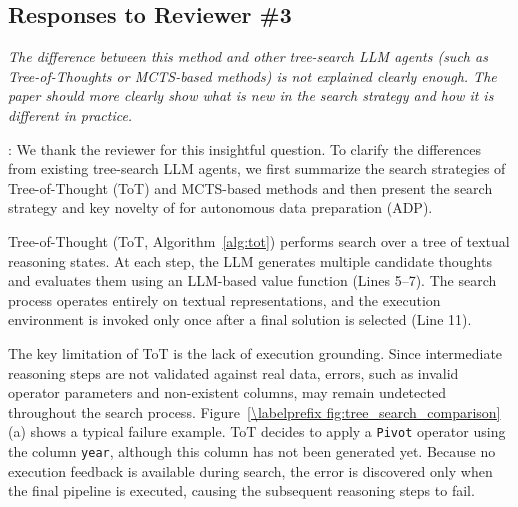 \subsection*{Responses to Reviewer \#3}
\label{cover_letter:r3}

\begin{shaded}
{
\emph{The difference between this method and other tree-search LLM agents (such as Tree-of-Thoughts or MCTS-based methods) is not explained clearly enough. The paper should more clearly show what is new in the search strategy and how it is different in practice.}
}
\end{shaded}

: 
We thank the reviewer for this insightful question. To clarify the differences from existing tree-search LLM agents, we first summarize the search strategies of Tree-of-Thought (ToT) and MCTS-based methods and then present the search strategy and key novelty of \sys for autonomous data preparation (ADP).


%
Tree-of-Thought (ToT, Algorithm~\ref{alg:tot}) performs search over a tree of textual reasoning states. At each step, the LLM generates multiple candidate thoughts and evaluates them using an LLM-based value function (Lines 5--7). The search process operates entirely on textual representations, and the execution environment is invoked only once after a final solution is selected (Line 11).

The key limitation of ToT is the lack of execution grounding. Since intermediate reasoning steps are not validated against real data, errors, such as invalid operator parameters and non-existent columns, may remain undetected throughout the search process.
%
Figure~\ref{\labelprefix fig:tree_search_comparison}(a) shows a typical failure example. ToT decides to apply a \texttt{Pivot} operator using the column \texttt{year}, although this column has not been generated yet. Because no execution feedback is available during search, the error is discovered only when the final pipeline is executed, causing the subsequent reasoning steps to fail.




